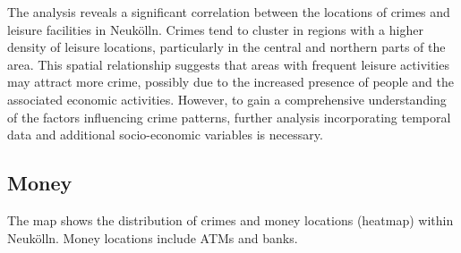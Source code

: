 The analysis reveals a significant correlation between the locations of crimes and leisure facilities in Neukölln. Crimes tend to cluster in regions with a higher density of leisure locations, particularly in the central and northern parts of the area. This spatial relationship suggests that areas with frequent leisure activities may attract more crime, possibly due to the increased presence of people and the associated economic activities. However, to gain a comprehensive understanding of the factors influencing crime patterns, further analysis incorporating temporal data and additional socio-economic variables is necessary. 
\subsection{Money}
The map shows the distribution of crimes and money locations (heatmap) within Neukölln. Money locations include ATMs and banks. 

